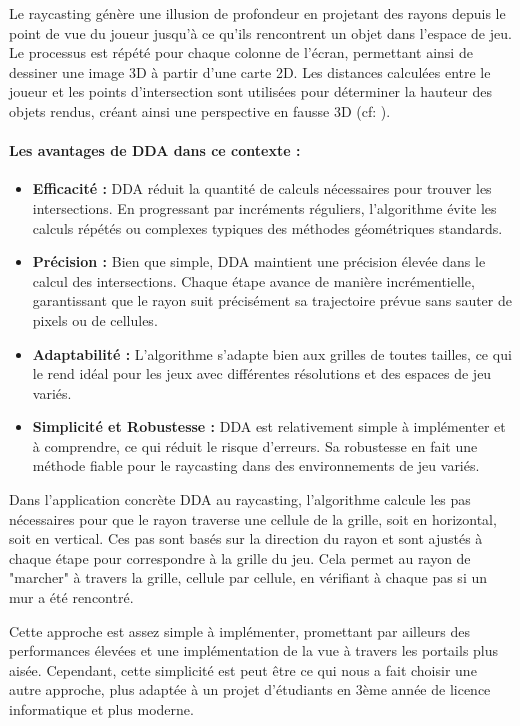 \documentclass[11pt]{article}
\begin{document}
Le raycasting génère une illusion de profondeur en projetant des rayons depuis le point de vue du joueur jusqu'à ce qu'ils rencontrent un 
objet dans l'espace de jeu. Le processus est répété pour chaque colonne de l'écran, permettant ainsi de dessiner une image 3D à partir d'une
carte 2D. Les distances calculées entre le joueur et les points d'intersection sont utilisées pour déterminer la hauteur des objets rendus, 
créant ainsi une perspective en fausse 3D (cf: ).

\paragraph{Les avantages de DDA dans ce contexte :}
\begin{itemize}
\item \textbf{Efficacité :} DDA réduit la quantité de calculs nécessaires pour trouver les intersections. En progressant par 
incréments réguliers, l'algorithme évite les calculs répétés ou complexes typiques des méthodes géométriques standards.
\item \textbf{Précision :} Bien que simple, DDA maintient une précision élevée dans le calcul des intersections. Chaque étape 
avance de manière incrémentielle, garantissant que le rayon suit précisément sa trajectoire prévue sans sauter de pixels ou de cellules.
\item \textbf{Adaptabilité :} L'algorithme s'adapte bien aux grilles de toutes tailles, ce qui le rend idéal pour les jeux avec 
différentes résolutions et des espaces de jeu variés.
\item \textbf{Simplicité et Robustesse :} DDA est relativement simple à implémenter et à comprendre, ce qui réduit le risque 
d'erreurs. Sa robustesse en fait une méthode fiable pour le raycasting dans des environnements de jeu variés.
\end{itemize}

Dans l'application concrète DDA au raycasting, l'algorithme calcule les pas nécessaires pour que le rayon 
traverse une cellule de la grille, soit en horizontal, soit en vertical. Ces pas sont basés sur la direction du 
rayon et sont ajustés à chaque étape pour correspondre à la grille du jeu. Cela permet au rayon de "marcher" à travers 
la grille, cellule par cellule, en vérifiant à chaque pas si un mur a été rencontré.

\noindent Cette approche est assez simple à implémenter, promettant par ailleurs des performances élevées et 
une implémentation de la vue à travers les portails plus aisée. Cependant, cette simplicité est peut être ce qui 
nous a fait choisir une autre approche, plus adaptée à un projet d'étudiants en 3ème année de licence informatique et plus moderne.
 
\end{document}
